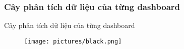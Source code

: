  
\subsubsection{Cây phân tích dữ liệu của từng dashboard}
\begin{frame}{Cây phân tích dữ liệu của từng dashboard}
\begin{figure}[H]
\centering
\texttt{[image: pictures/black.png]}
\end{figure}
\end{frame}
